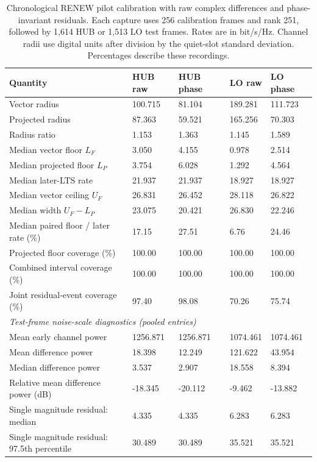 \begin{table}[htbp]\centering\small
\setlength{\tabcolsep}{4pt}
\caption{Chronological RENEW pilot calibration with raw complex differences and phase-invariant residuals. Each capture uses 256 calibration frames and rank 251, followed by 1,614 HUB or 1,513 LO test frames. Rates are in bit/s/Hz. Channel radii use digital units after division by the quiet-slot standard deviation. Percentages describe these recordings.}\label{supp:hardware_calibration}
\begin{tabular}{lllll}\toprule
Quantity & HUB raw & HUB phase & LO raw & LO phase\\
\midrule
Vector radius & 100.715 & 81.104 & 189.281 & 111.723\\
Projected radius & 87.363 & 59.521 & 165.256 & 70.303\\
Radius ratio & 1.153 & 1.363 & 1.145 & 1.589\\
Median vector floor $L_F$ & 3.050 & 4.155 & 0.978 & 2.514\\
Median projected floor $L_P$ & 3.754 & 6.028 & 1.292 & 4.564\\
Median later-LTS rate & 21.937 & 21.937 & 18.927 & 18.927\\
Median vector ceiling $U_F$ & 26.831 & 26.452 & 28.118 & 26.822\\
Median width $U_F-L_P$ & 23.075 & 20.421 & 26.830 & 22.246\\
Median paired floor / later rate (\%) & 17.15 & 27.51 & 6.76 & 24.46\\
Projected floor coverage (\%) & 100.00 & 100.00 & 100.00 & 100.00\\
Combined interval coverage (\%) & 100.00 & 100.00 & 100.00 & 100.00\\
Joint residual-event coverage (\%) & 97.40 & 98.08 & 70.26 & 75.74\\
\multicolumn{5}{l}{\textit{Test-frame noise-scale diagnostics (pooled entries)}}\\
Mean early channel power & 1256.871 & 1256.871 & 1074.461 & 1074.461\\
Mean difference power & 18.398 & 12.249 & 121.622 & 43.954\\
Median difference power & 3.537 & 2.907 & 18.558 & 8.394\\
Relative mean difference power (dB) & -18.345 & -20.112 & -9.462 & -13.882\\
Single magnitude residual: median & 4.335 & 4.335 & 6.283 & 6.283\\
Single magnitude residual: 97.5th percentile & 30.489 & 30.489 & 35.521 & 35.521\\

\end{tabular}
\end{table}
